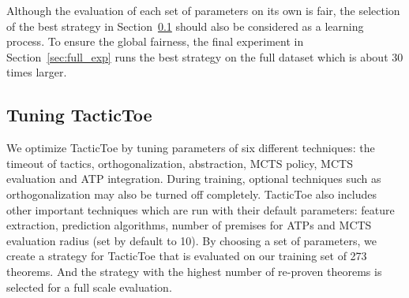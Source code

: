 \documentclass[runningheads,a4paper,draft]{svjour3}
\def\tactictoe{\textsf{TacticToe}\xspace}
\begin{document}
Although the evaluation of each set of parameters on its own is fair,
the selection of the best strategy in Section~\ref{sec:tuning} should also be
considered as a learning process. To ensure the global fairness, the final
experiment in Section~\ref{sec:full_exp} runs the best strategy on the full
dataset which is about 30 times larger.

\subsection{Tuning \tactictoe}\label{sec:tuning}

We optimize \tactictoe by tuning parameters of six different techniques:
the timeout of tactics, orthogonalization, abstraction, MCTS policy, MCTS
evaluation and ATP integration. During training, optional techniques such as
orthogonalization may also be turned off completely.
\tactictoe also includes other important techniques which are run with their
default parameters: feature extraction, prediction
algorithms, number of premises for ATPs and MCTS evaluation radius (set by default to
10).
By choosing a set of parameters, we create a strategy for
\tactictoe that is evaluated on our training set of 273 theorems. And the
strategy with the highest number of re-proven theorems is selected for
a full scale evaluation.
\end{document}

